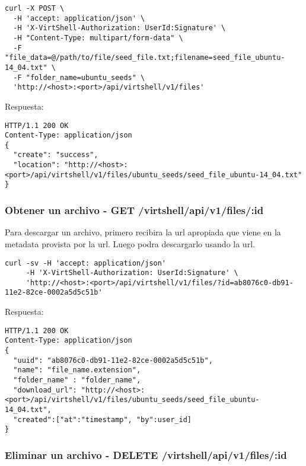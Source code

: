 \begin{lstlisting}[style=json]
curl -X POST \
  -H 'accept: application/json' \
  -H 'X-VirtShell-Authorization: UserId:Signature' \
  -H "Content-Type: multipart/form-data" \
  -F "file_data=@/path/to/file/seed_file.txt;filename=seed_file_ubuntu-14_04.txt" \
  -F "folder_name=ubuntu_seeds" \
  'http://<host>:<port>/api/virtshell/v1/files'
\end{lstlisting}

\vspace{1cm}
Respuesta:
\vspace{1cm}

\begin{lstlisting}[style=json]
HTTP/1.1 200 OK
Content-Type: application/json
{ 
  "create": "success",
  "location": "http://<host>:<port>/api/virtshell/v1/files/ubuntu_seeds/seed_file_ubuntu-14_04.txt" 
}
\end{lstlisting}

\subsubsection{Obtener un archivo - GET /virtshell/api/v1/files/:id}

Para descargar un archivo, primero recibira la url apropiada que viene en la metadata provista por la url. Luego podra descargarlo usando la url.

\begin{lstlisting}[style=json]
curl -sv -H 'accept: application/json' 
     -H 'X-VirtShell-Authorization: UserId:Signature' \ 
     'http://<host>:<port>/api/virtshell/v1/files/?id=ab8076c0-db91-11e2-82ce-0002a5d5c51b'
\end{lstlisting}

\vspace{1cm}
Respuesta:
\vspace{1cm}

\begin{lstlisting}[style=json]
HTTP/1.1 200 OK
Content-Type: application/json
{
  "uuid": "ab8076c0-db91-11e2-82ce-0002a5d5c51b",
  "name": "file_name.extension",
  "folder_name" : "folder_name",
  "download_url": "http://<host>:<port>/api/virtshell/v1/files/ubuntu_seeds/seed_file_ubuntu-14_04.txt",
  "created":["at":"timestamp", "by":user_id] 
}
\end{lstlisting}

\subsubsection{Eliminar un archivo - DELETE /virtshell/api/v1/files/:id}


